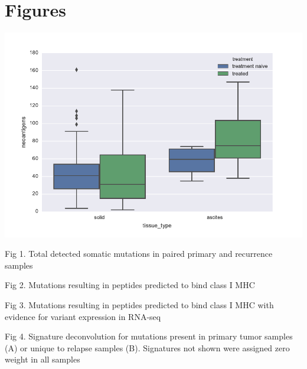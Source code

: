 \section{Figures}
\includegraphics{figures/fig1.pdf}

Fig 1. Total detected somatic mutations in paired primary and recurrence samples

Fig 2. Mutations resulting in peptides predicted to bind class I MHC

Fig 3. Mutations resulting in peptides predicted to bind class I MHC with evidence for variant expression in RNA-seq

Fig 4. Signature deconvolution for mutations present in primary tumor samples (A) or unique to relapse samples (B). Signatures not shown were assigned zero weight in all samples